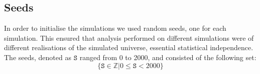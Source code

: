     \subsection{Seeds}
        In order to initialise the simulations we used random seeds, one for each simulation. This ensured that analysis performed on different simulations were of different realisations of the simulated universe, essential statistical independence. The seeds, denoted as $\mathtt{S}$ ranged from 0 to 2000, and consisted of the following set:
        \begin{equation}
            \{\mathtt{S} \in \mathbb{Z} | 0 \leq \mathtt{S} < 2000 \}
        \end{equation}